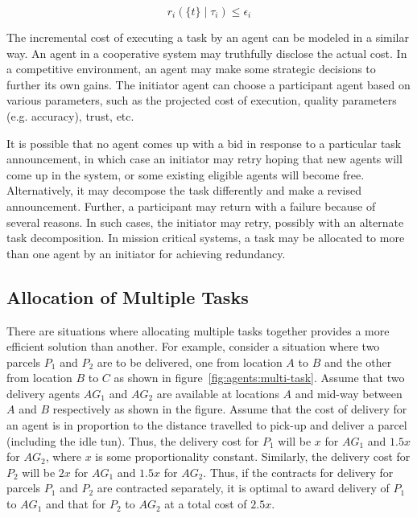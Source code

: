 \begin{equation}
	r_i(\{ t \} \mid \tau_i) \leq \epsilon_i
\end{equation}

\noindent
The incremental cost of executing a task by an agent can be modeled in a similar way. An agent in a cooperative system may truthfully
disclose the actual cost. In a competitive environment, an agent may make some strategic decisions to further its own gains. 
The initiator agent can choose a participant agent based on various parameters, such as the projected cost of execution, 
quality parameters (e.g. accuracy), trust, etc.

It is possible that no agent comes up with a bid in response to a particular task announcement, in which case an initiator may
retry hoping that new agents will come up in the system, or some existing eligible agents will become free. Alternatively, it may
decompose the task differently and make a revised announcement. Further, a participant may return with a failure because of several
reasons. In such cases, the initiator may retry, possibly with an alternate task decomposition. In mission critical systems, a 
task may be allocated to more than one agent by an initiator for achieving redundancy. 


\subsection{Allocation of Multiple Tasks}

There are situations where allocating multiple tasks together provides a more efficient solution than another. For example, consider
a situation where two parcels $P_1$ and $P_2$ are to be delivered, one from location $A$ to $B$ and the other from location $B$ to $C$ 
as shown in figure~\ref{fig:agents:multi-task}. Assume that two delivery agents $AG_1$ and $AG_2$ are available at locations $A$ and
mid-way between $A$ and $B$ respectively as shown in the figure. Assume that the cost of delivery for an agent is in proportion to the 
distance travelled to pick-up and deliver a parcel (including the idle tun). Thus, the delivery cost for $P_1$ will be $x$ for $AG_1$ 
and $1.5x$ for $AG_2$, where $x$ is some proportionality constant. Similarly, the delivery cost for $P_2$ will be $2x$ for $AG_1$ and 
$1.5x$ for $AG_2$. Thus, if the contracts for delivery for parcels $P_1$ and $P_2$ are contracted separately, it is optimal to award 
delivery of $P_1$ to $AG_1$ and that for $P_2$ to $AG_2$ at a total cost of $2.5x$.

